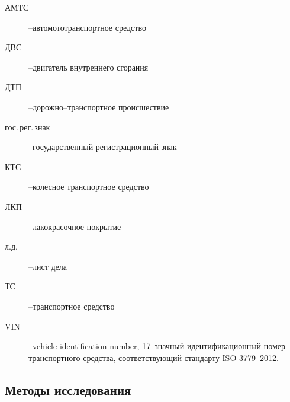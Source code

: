 \begin{description}
%	 
\item[АМТС] --автомототранспортное средство
\item[ДВС] --двигатель внутреннего сгорания
\item[ДТП] --дорожно--транспортное происшествие
\item[гос.\,рег.\,знак] --государственный регистрационный знак
\item[КТС] --колесное транспортное средство 
\item[ЛКП] --лакокрасочное покрытие
\item[л.д.] --лист дела
\item[ТС] --транспортное средство
\item[VIN] --vehicle identification number, 17--значный идентификационный номер транспортного средства, соответствующий стандарту ISO 3779--2012.
%
\end{description}

\subsection{Методы исследования}

